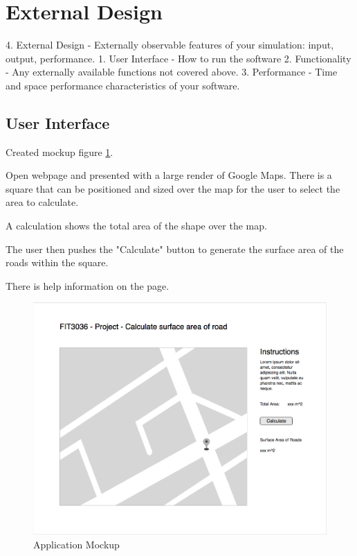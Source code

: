 \documentclass[a4paper,11pt]{article}
\begin{document}
\section{External Design}


4. External Design - Externally observable features of your simulation: input, output, performance.
  1. User Interface - How to run the software
  2. Functionality - Any externally available functions not covered above.
  3. Performance - Time and space performance characteristics of your software.


\subsection{User Interface}


Created mockup figure \ref{fig:mockup}. %

Open webpage and presented with a large render of Google Maps. There is a square that can be positioned and sized over the map for the user to select the area to calculate.

A calculation shows the total area of the shape over the map.

The user then pushes the "Calculate" button to generate the surface area of the roads within the square.

There is help information on the page.

\begin{figure}[H]
  \includegraphics[width=\textwidth]{UI-mockup}
  \caption{Application Mockup}
  \label{fig:mockup}
\end{figure}
\end{document}
